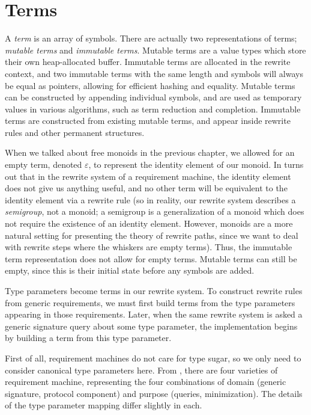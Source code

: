 \documentclass[../generics]{subfiles}
\begin{document}
\section{Terms}\label{building terms}

%
%
%
A \emph{term} is an array of symbols. There are actually two representations of terms; \emph{mutable terms} and \emph{immutable terms}. Mutable terms are a value types which store their own heap-allocated buffer. Immutable terms are allocated in the rewrite context, and two immutable terms with the same length and symbols will always be equal as pointers, allowing for efficient hashing and equality. Mutable terms can be constructed by appending individual symbols, and are used as temporary values in various algorithms, such as term reduction and completion. Immutable terms are constructed from existing mutable terms, and appear inside rewrite rules and other permanent structures.

%
%
%
When we talked about free monoids in the previous chapter, we allowed for an empty term, denoted $\varepsilon$, to represent the identity element of our monoid. In turns out that in the rewrite system of a requirement machine, the identity element does not give us anything useful, and no other term will be equivalent to the identity element via a rewrite rule (so in reality, our rewrite system describes a \emph{semigroup}, not a monoid; a semigroup is a generalization of a monoid which does not require the existence of an identity element. However, monoids are a more natural setting for presenting the theory of rewrite paths, since we want to deal with rewrite steps where the whiskers are empty terms). Thus, the immutable term representation does not allow for empty terms. Mutable terms can still be empty, since this is their initial state before any symbols are added.

%
Type parameters become terms in our rewrite system. To construct rewrite rules from generic requirements, we must first build terms from the type parameters appearing in those requirements. Later, when the same rewrite system is asked a generic signature query about some type parameter, the implementation begins by building a term from this type parameter.

First of all, requirement machines do not care for type sugar, so we only need to consider canonical type parameters here. From , there are four varieties of requirement machine, representing the four combinations of domain (generic signature, protocol component) and purpose (queries, minimization). The details of the type parameter mapping differ slightly in each.
\end{document}

